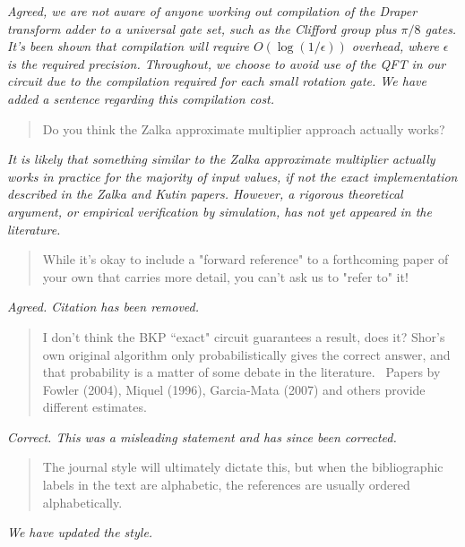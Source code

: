 \documentclass{article}
\theoremstyle{plain} \newtheorem{lemma}{Lemma}
\begin{document}
{\it Agreed, we are not aware of anyone working out compilation of the Draper
transform adder to a universal gate set, such as the Clifford group plus
$\pi/8$ gates. It's been shown that compilation will require $O(\log (1/\epsilon))$ overhead, where $\epsilon$ is the required precision. 
Throughout, we choose to avoid use of the QFT in our circuit due to the compilation required for each small rotation gate.  We have added a sentence regarding this compilation cost.
}

\begin{quote}
Do you think the Zalka approximate multiplier approach actually works?
\end{quote}

{\it It is likely that something similar to the Zalka approximate
multiplier actually works in practice for the majority of input values,
if not the exact implementation described in
the Zalka and Kutin papers. However, a rigorous theoretical argument, or
empirical verification by simulation, has not yet appeared in the literature.
}

\begin{quote}
While it's okay to include a "forward reference" to a forthcoming
paper of your own that carries more detail, you can't ask us to "refer
to" it!
\end{quote}

{\it Agreed. Citation has been removed.}

\begin{quote}
I don't think the BKP ``exact" circuit guarantees a result, does it?
Shor's own original algorithm only probabilistically gives the correct
answer, and that probability is a matter of some debate in the
literature.  Papers by Fowler (2004), Miquel (1996), Garcia-Mata
(2007) and others provide different estimates.
\end{quote}

{\it Correct.  This was a misleading statement and has since been corrected.}

\begin{quote}
The journal style will ultimately dictate this, but when the
bibliographic labels in the text are alphabetic, the references are
usually ordered alphabetically.
\end{quote}

{\it We have updated the style.}

\end{document}
